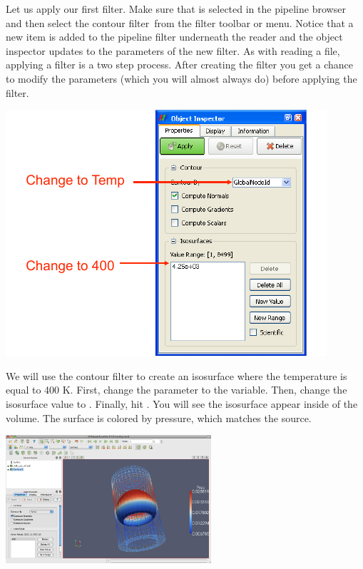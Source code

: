 Let us apply our first filter.  Make sure that  is
selected in the pipeline browser and then select the contour
filter~\contour from the filter toolbar or  menu.  Notice that
a new item is added to the pipeline filter underneath the reader and the
object inspector updates to the parameters of the new filter.  As with
reading a file, applying a filter is a two step process.  After creating
the filter you get a chance to modify the parameters (which you will almost
always do) before applying the filter.

\begin{inlinefig}
  \includegraphics{images/ContourOptions}
\end{inlinefig}

We will use the contour filter to create an isosurface where the
temperature is equal to 400 K.  First, change the 
parameter to the  variable.  Then, change the isosurface value to
.  Finally, hit \apply.  You will see the isosurface appear inside
of the volume.  The surface is colored by pressure, which matches the
source.

\begin{inlinefig}
  \includegraphics[width=3in]{images/ContourResults}
\end{inlinefig}

